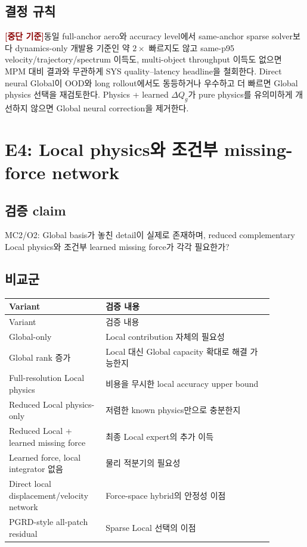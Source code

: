 \documentclass[11pt,a4paper]{article}
\newcommand{\killgate}{\textcolor{darkred}{\textbf{[중단 기준]}}}
\begin{document}
\subsection*{결정 규칙}

\killgate 동일 full-anchor aero와 accuracy level에서 same-anchor sparse solver보다
dynamics-only 개발용 기준인 약 \(2\times\) 빠르지도 않고
same-p95 velocity/trajectory/spectrum 이득도, multi-object throughput 이득도 없으면
MPM 대비 결과와 무관하게 SYS quality--latency headline을 철회한다.
Direct neural Global이 OOD와 long rollout에서도 동등하거나 우수하고 더 빠르면
Global physics 선택을 재검토한다.
Physics + learned \(\Delta Q_g\)가 pure physics를 유의미하게 개선하지 않으면
Global neural correction을 제거한다.

\section{E4: Local physics와 조건부 missing-force network}

\subsection*{검증 claim}

MC2/O2: Global basis가 놓친 detail이 실제로 존재하며,
reduced complementary Local physics와 조건부 learned missing force가 각각 필요한가?

\subsection*{비교군}

\begin{longtable}{L{0.30\linewidth}L{0.58\linewidth}}
\toprule
Variant & 검증 내용 \\
\midrule
\endfirsthead
\toprule
Variant & 검증 내용 \\
\midrule
\endhead
Global-only & Local contribution 자체의 필요성 \\
\addlinespace
Global rank 증가 & Local 대신 Global capacity 확대로 해결 가능한지 \\
\addlinespace
Full-resolution Local physics & 비용을 무시한 local accuracy upper bound \\
\addlinespace
Reduced Local physics-only & 저렴한 known physics만으로 충분한지 \\
\addlinespace
Reduced Local + learned missing force & 최종 Local expert의 추가 이득 \\
\addlinespace
Learned force, local integrator 없음 & 물리 적분기의 필요성 \\
\addlinespace
Direct local displacement/velocity network & Force-space hybrid의 안정성 이점 \\
\addlinespace
PGRD-style all-patch residual & Sparse Local 선택의 이점 \\
\bottomrule
\end{longtable}
\end{document}
